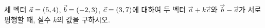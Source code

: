 세 벡터 $\vec{a}=(5{,}\mkern3mu\mathopen{}4)$, $\vec{b}=(-2{,}\mkern3mu\mathopen{}3)$, $\vec{c}=(3{,}\mkern3mu\mathopen{}7)$에 대하여 두 벡터 $\vec{a}+k\vec{c}$와 $\vec{b}-\vec{a}$가 서로 평행할 때, 실수 $k$의 값을 구하시오.
